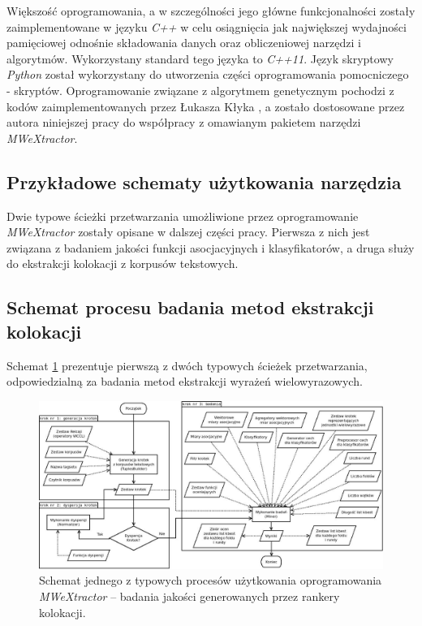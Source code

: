 \par
Większość oprogramowania, a w szczególności jego główne funkcjonalności zostały zaimplementowane w języku \emph{C++} w celu osiągnięcia jak największej wydajności pamięciowej odnośnie składowania danych oraz obliczeniowej narzędzi i algorytmów.
Wykorzystany standard tego języka to \emph{C++11}.
Język skryptowy \emph{Python} został wykorzystany do utworzenia części oprogramowania pomocniczego - skryptów.
Oprogramowanie związane z algorytmem genetycznym pochodzi z kodów zaimplementowanych przez Łukasza Kłyka \cite{klyk}, a zostało dostosowane przez autora niniejszej pracy do współpracy z omawianym pakietem narzędzi \emph{MWeXtractor}.


\subsection{Przykładowe schematy użytkowania narzędzia}
Dwie typowe ścieżki przetwarzania umożliwione przez oprogramowanie \emph{MWeXtractor} zostały opisane w dalszej części pracy.
Pierwsza z nich jest związana z badaniem jakości funkcji asocjacyjnych i klasyfikatorów, a druga służy do ekstrakcji kolokacji z korpusów tekstowych.

\subsection{Schemat procesu badania metod ekstrakcji kolokacji}
Schemat \ref{user_processing_scheme_research} prezentuje pierwszą z dwóch typowych ścieżek przetwarzania, odpowiedzialną za badania metod ekstrakcji wyrażeń wielowyrazowych.

\begin{figure}[h!]
\centering
\includegraphics[width=\textwidth]{charts/user_processing_scheme_research.jpg}
\caption [Przykładowy schemat procesu badania jakości rankerów]{Schemat jednego z typowych procesów użytkowania oprogramowania \emph{MWeXtractor} -- badania jakości generowanych przez rankery kolokacji.}
\label{user_processing_scheme_research}
\end{figure}

